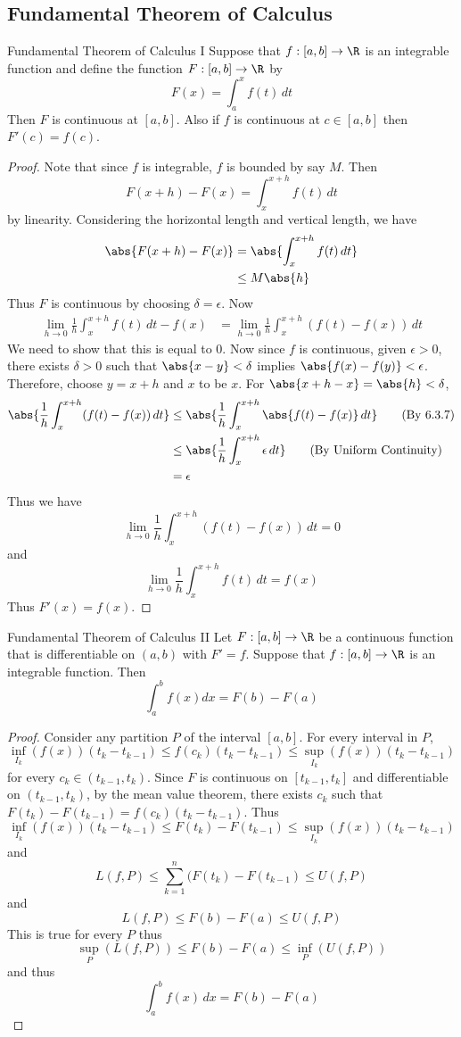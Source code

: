 \subsection{Fundamental Theorem of Calculus}
\begin{thm}{Fundamental Theorem of Calculus I}{} Suppose that $f:[a,b]\to\R$ is an integrable function and define the function $F:[a,b]\to\R$ by $$F(x)=\int_{a}^{x}f(t)\,dt$$ Then $F$ is continuous at $[a,b]$. Also if $f$ is continuous at $c\in[a,b]$ then $F'(c)=f(c)$. \tcbline
\begin{proof}
Note that since $f$ is integrable, $f$ is bounded by say $M$. Then $$F(x+h)-F(x)=\int_x^{x+h}f(t)\,dt$$ by linearity. Considering the horizontal length and vertical length, we have
\begin{align*}
\abs{F(x+h)-F(x)}&=\abs{\int_x^{x+h}f(t)\,dt}\\
&\leq M\abs{h}
\end{align*}
Thus $F$ is continuous by choosing $\delta=\epsilon$. 
Now 
\begin{align*}
\lim_{h\to 0}\frac{1}{h}\int_x^{x+h}f(t)\,dt-f(x)&=\lim_{h\to 0}\frac{1}{h}\int_x^{x+h}(f(t)-f(x))\,dt
\end{align*}
We need to show that this is equal to $0$. Now since $f$ is continuous, given $\epsilon>0$, there exists $\delta>0$ such that $\abs{x-y}<\delta$ implies $\abs{f(x)-f(y)}<\epsilon$. Therefore, choose $y=x+h$ and $x$ to be $x$. For $\abs{x+h-x}=\abs{h}<\delta$, 
\begin{align*}
\abs{\frac{1}{h}\int_x^{x+h}(f(t)-f(x))\,dt}&\leq\abs{\frac{1}{h}\int_x^{x+h}\abs{f(t)-f(x)}\,dt}\tag{By 6.3.7}\\
&\leq\abs{\frac{1}{h}\int_x^{x+h}\epsilon\,dt}\tag{By Uniform Continuity}\\
&=\epsilon
\end{align*}
Thus we have $$\lim_{h\to 0}\frac{1}{h}\int_x^{x+h}(f(t)-f(x))\,dt=0$$ and $$\lim_{h\to 0}\frac{1}{h}\int_x^{x+h}f(t)\,dt=f(x)$$
Thus $F'(x)=f(x)$. 
\end{proof}
\end{thm}

\begin{thm}{Fundamental Theorem of Calculus II}{} Let $F:[a,b]\to\R$ be a continuous function that is differentiable on $(a,b)$ with $F'=f$. Suppose that $f:[a,b]\to\R$ is an integrable function. Then $$\int_{a}^{b}f(x)dx=F(b)-F(a)$$ \tcbline
\begin{proof}
Consider any partition $P$ of the interval $[a,b]$. For every interval in $P$, $$\inf_{I_k}(f(x))(t_k-t_{k-1})\leq f(c_k)(t_k-t_{k-1})\leq\sup_{I_k}(f(x))(t_k-t_{k-1})$$
for every $c_k\in(t_{k-1},t_k)$. Since $F$ is continuous on $[t_{k-1},t_k]$ and differentiable on $(t_{k-1},t_k)$, by the mean value theorem, there exists $c_k$ such that $F(t_k)-F(t_{k-1})=f(c_k)(t_k-t_{k-1})$. Thus $$\inf_{I_k}(f(x))(t_k-t_{k-1})\leq F(t_k)-F(t_{k-1})\leq\sup_{I_k}(f(x))(t_k-t_{k-1})$$ and $$L(f,P)\leq\sum_{k=1}^n(F(t_k)-F(t_{k-1})\leq U(f,P)$$ and $$L(f,P)\leq F(b)-F(a)\leq U(f,P)$$ This is true for every $P$ thus $$\sup_{P}(L(f,P))\leq F(b)-F(a)\leq\inf_{P}(U(f,P))$$ and thus $$\int_a^bf(x)\,dx=F(b)-F(a)$$
\end{proof}
\end{thm}

